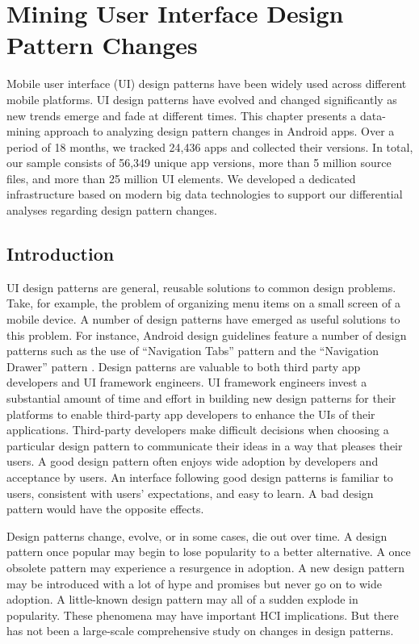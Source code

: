 \chapter{Mining User Interface Design Pattern Changes}
\label{mining_design_changes_chapter}
Mobile user interface (UI) design patterns have been widely used across different mobile platforms.
UI design patterns have evolved and changed significantly as new trends emerge and fade at different times.
This chapter presents a data-mining approach to analyzing design pattern changes in Android apps.
Over a period of 18 months, we tracked 24,436 apps and collected their versions.
In total, our sample consists of 56,349 unique app versions, more than 5 million source files, and more than 25 million UI elements.
We developed a dedicated infrastructure based on modern big data technologies to support our differential analyses regarding design pattern changes.
\section{Introduction}
UI design patterns are general, reusable solutions to common design problems.
Take, for example, the problem of organizing menu items on a small screen of a mobile device.
A number of design patterns have emerged as useful solutions to this problem.
For instance, Android design guidelines feature a number of design patterns such as the use of ``Navigation Tabs'' pattern \cite{action_bar_nav_tabs} and the ``Navigation Drawer'' pattern \cite{nav_drawer}.
Design patterns are valuable to both third party app developers and UI framework engineers.
UI framework engineers invest a substantial amount of time and effort in building new design patterns for their platforms to enable third-party app developers to enhance the UIs of their applications.
Third-party developers make difficult decisions when choosing a particular design pattern to communicate their ideas in a way that pleases their users.
A good design pattern often enjoys wide adoption by developers and acceptance by users.
An interface following good design patterns is familiar to users, consistent with users' expectations, and easy to learn.
A bad design pattern would have the opposite effects.

\par Design patterns change, evolve, or in some cases, die out over time.
A design pattern once popular may begin to lose popularity to a better alternative. 
A once obsolete pattern may experience a resurgence in adoption.
A new design pattern may be introduced with a lot of hype and promises but never go on to wide adoption.
A little-known design pattern may all of a sudden explode in popularity.
These phenomena may have important HCI implications. But there has not been a large-scale comprehensive study on changes in design patterns.

